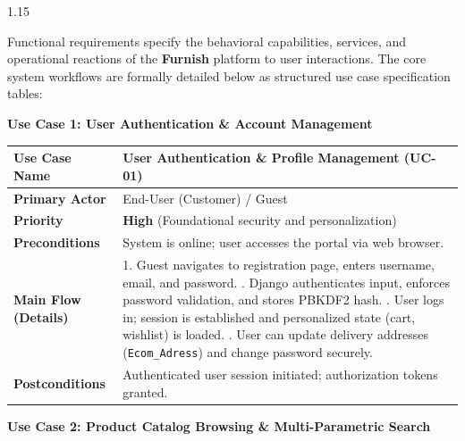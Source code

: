 \documentclass[12pt,a4paper]{article}
\begin{document}
{\fontsize{13}{18}\selectfont
\begin{spacing}{1.15}

\noindent
Functional requirements specify the behavioral capabilities, services, and operational reactions of the \textbf{Furnish} platform to user interactions. The core system workflows are formally detailed below as structured use case specification tables:

\vspace{0.10in}

\noindent
\textbf{Use Case 1: User Authentication \& Account Management}

\vspace{0.04in}

\begin{center}
\renewcommand{\arraystretch}{1.2}
\fontsize{10.5}{14}\selectfont
\begin{tabular}{|p{1.6in}|p{4.9in}|}
\hline
\textbf{Use Case Name} & User Authentication \& Profile Management (\textbf{UC-01}) \\ \hline
\textbf{Primary Actor} & End-User (Customer) / Guest \\ \hline
\textbf{Priority} & \textbf{High} (Foundational security and personalization) \\ \hline
\textbf{Preconditions} & System is online; user accesses the portal via web browser. \\ \hline
\textbf{Main Flow (Details)} &
1. Guest navigates to registration page, enters username, email, and password. \newline
2. Django authenticates input, enforces password validation, and stores PBKDF2 hash. \newline
3. User logs in; session is established and personalized state (cart, wishlist) is loaded. \newline
4. User can update delivery addresses (\texttt{Ecom\_Adress}) and change password securely. \\ \hline
\textbf{Postconditions} & Authenticated user session initiated; authorization tokens granted. \\ \hline
\end{tabular}
\end{center}

\vspace{0.08in}

\noindent
\textbf{Use Case 2: Product Catalog Browsing \& Multi-Parametric Search}

\vspace{0.04in}


\end{spacing}}
\end{document}
